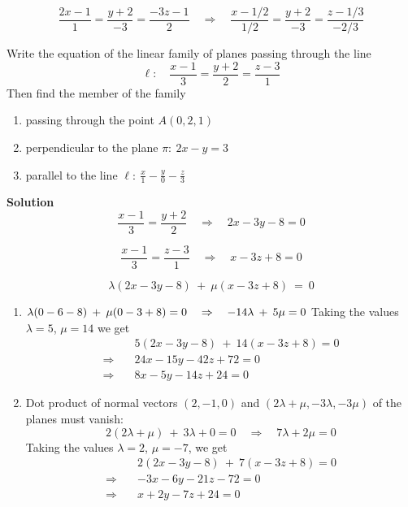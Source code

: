 \documentclass[11pt]{amsbook}
\begin{document}




\[
\frac{2x-1}{1} = \frac{y+2}{-3} = \frac{-3z-1}{2} 
\quad \Rightarrow \quad
\frac{x-1/2}{1/2} = \frac{y+2}{-3} = \frac{z-1/3}{-2/3}   
\]
\begin{exmp}
Write the equation of the linear family of planes passing through the line
\[
\ell: \quad  \frac{x-1}{3} = \frac{y+2}{2} = \frac{z-3}{1}
\]
Then find the member of the family
\begin{enumerate}
\item passing through the point $A(0, 2, 1)$
\item perpendicular to the plane \( \pi: \: 2x-y = 3 \)
\item parallel to the line \( \ell: \: \frac{x}{1} - \frac{y}{0} - \frac{z}{3} \)
\end{enumerate}
\end{exmp}
\textbf{Solution} \quad
\[
\frac{x-1}{3} = \frac{y+2}{2} \quad \Rightarrow \quad 2x - 3y - 8 = 0
\]

\[
\frac{x-1}{3} = \frac{z-3}{1} \quad \Rightarrow \quad x - 3z + 8 = 0
\]

\[
\lambda ( 2x - 3y - 8 ) \: + \: \mu ( x - 3z + 8 ) \: = \: 0
\]
\begin{enumerate}
\item \( \lambda ( 0 - 6 - 8 ) \:  + \:  \mu ( 0 - 3 + 8 ) = 0  \quad \Rightarrow \quad 
-14\lambda \: + \: 5\mu = 0 \\ \) Taking the values $\lambda = 5$, $\mu = 14$ we get
\begin{align*}
& 5(2x -3y -8) \: + \: 14(x - 3z + 8) = 0 \\
\Rightarrow \quad &24x -15y - 42z +72 = 0 \\ 
\Rightarrow \quad &8x - 5y - 14z + 24 = 0 
\end{align*}
\item Dot product of normal vectors $(2, -1, 0)$ and $(2\lambda + \mu , -3\lambda, -3\mu)$ of the planes must vanish:
\[
2(2\lambda + \mu) \: + \: 3\lambda + 0 = 0 \quad \Rightarrow \quad 7\lambda + 2\mu = 0
\]
Taking the values $\lambda = 2$, $\mu = -7$, we get
\begin{align*}
& 2(2x -3y -8) \: + \: 7(x - 3z + 8) = 0 \\
\Rightarrow \quad &-3x -6y - 21z - 72 = 0 \\ 
\Rightarrow \quad &x + 2y - 7z + 24 = 0 
\end{align*}
\end{enumerate}

\end{document}
